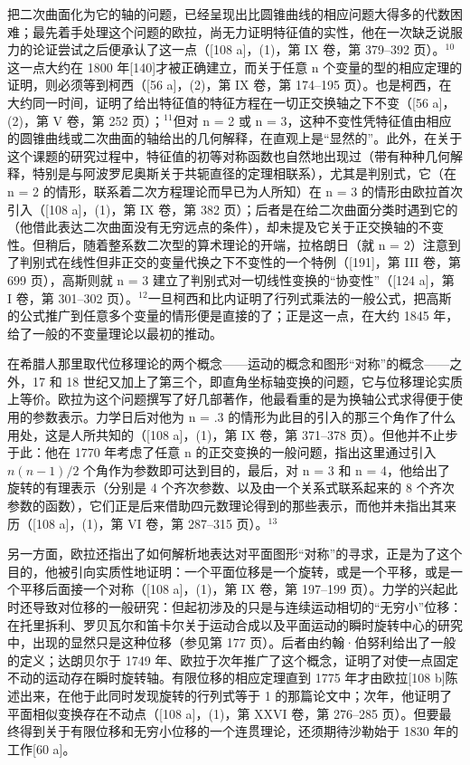 把二次曲面化为它的轴的问题，已经呈现出比圆锥曲线的相应问题大得多的代数困难；最先着手处理这个问题的欧拉，尚无力证明特征值的实性，他在一次缺乏说服力的论证尝试之后便承认了这一点（{[}108 a{]}，(1)，第 IX 卷，第 379–392 页）。\(^{10}\)这一点大约在 1800 年{[}140{]}才被正确建立，而关于任意 n 个变量的型的相应定理的证明，则必须等到柯西（{[}56 a{]}，(2)，第 IX 卷，第 174–195 页）。也是柯西，在大约同一时间，证明了给出特征值的特征方程在一切正交换轴之下不变（{[}56 a{]}，(2)，第 V 卷，第 252 页）；\(^{11}\)但对 n = 2 或 n = 3，这种不变性凭特征值由相应的圆锥曲线或二次曲面的轴给出的几何解释，在直观上是“显然的”。此外，在关于这个课题的研究过程中，特征值的初等对称函数也自然地出现过（带有种种几何解释，特别是与阿波罗尼奥斯关于共轭直径的定理相联系），尤其是判别式，它（在 n = 2 的情形，联系着二次方程理论而早已为人所知）在 n = 3 的情形由欧拉首次引入（{[}108 a{]}，(1)，第 IX 卷，第 382 页）；后者是在给二次曲面分类时遇到它的（他借此表达二次曲面没有无穷远点的条件），却未提及它关于正交换轴的不变性。但稍后，随着整系数二次型的算术理论的开端，拉格朗日（就 n = 2）注意到了判别式在线性但非正交的变量代换之下不变性的一个特例（{[}191{]}，第 III 卷，第 699 页），高斯则就 n = 3 建立了判别式对一切线性变换的“协变性”（{[}124 a{]}，第 I 卷，第 301–302 页）。\(^{12}\)一旦柯西和比内证明了行列式乘法的一般公式，把高斯的公式推广到任意多个变量的情形便是直接的了；正是这一点，在大约 1845 年，给了一般的不变量理论以最初的推动。

在希腊人那里取代位移理论的两个概念——运动的概念和图形“对称”的概念——之外，17 和 18 世纪又加上了第三个，即直角坐标轴变换的问题，它与位移理论实质上等价。欧拉为这个问题撰写了好几部著作，他最看重的是为换轴公式求得便于使用的参数表示。力学日后对他为 n = .3 的情形为此目的引入的那三个角作了什么用处，这是人所共知的（{[}108 a{]}，(1)，第 IX 卷，第 371–378 页）。但他并不止步于此：他在 1770 年考虑了任意 n 的正交变换的一般问题，指出这里通过引入 \(n(n - 1)/2\) 个角作为参数即可达到目的，最后，对 n = 3 和 n = 4，他给出了旋转的有理表示（分别是 4 个齐次参数、以及由一个关系式联系起来的 8 个齐次参数的函数），它们正是后来借助四元数理论得到的那些表示，而他并未指出其来历（{[}108 a{]}，(1)，第 VI 卷，第 287–315 页）。\(^{13}\)

另一方面，欧拉还指出了如何解析地表达对平面图形“对称”的寻求，正是为了这个目的，他被引向实质性地证明：一个平面位移是一个旋转，或是一个平移，或是一个平移后面接一个对称（{[}108 a{]}，(1)，第 IX 卷，第 197–199 页）。力学的兴起此时还导致对位移的一般研究：但起初涉及的只是与连续运动相切的“无穷小”位移：在托里拆利、罗贝瓦尔和笛卡尔关于运动合成以及平面运动的瞬时旋转中心的研究中，出现的显然只是这种位移（参见第 177 页）。后者由约翰·伯努利给出了一般的定义；达朗贝尔于 1749 年、欧拉于次年推广了这个概念，证明了对使一点固定不动的运动存在瞬时旋转轴。有限位移的相应定理直到 1775 年才由欧拉{[}108 b{]}陈述出来，在他于此同时发现旋转的行列式等于 1 的那篇论文中；次年，他证明了平面相似变换存在不动点（{[}108 a{]}，(1)，第 XXVI 卷，第 276–285 页）。但要最终得到关于有限位移和无穷小位移的一个连贯理论，还须期待沙勒始于 1830 年的工作{[}60 a{]}。

